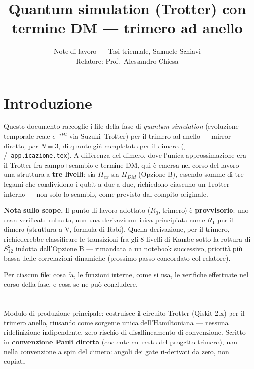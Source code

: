 \documentclass[11pt,a4paper]{article}
\title{Quantum simulation (Trotter) con termine DM — trimero ad anello}
\author{Note di lavoro — Tesi triennale, Samuele Schiavi\\ Relatore: Prof.\ Alessandro Chiesa}
\date{}
\begin{document}
\maketitle

\section*{Introduzione}

Questo documento raccoglie i file della fase di \emph{quantum simulation} (evoluzione
temporale reale $e^{-iHt}$ via Suzuki--Trotter) per il trimero ad anello — mirror
diretto, per $N=3$, di quanto già completato per il dimero
(\texttt{},
\texttt{}/\texttt{\_applicazione.tex}).
A differenza del dimero, dove l'unica approssimazione era il Trotter fra campo+scambio
e termine DM, qui è emersa nel corso del lavoro una struttura a \textbf{tre livelli}:
sia $H_{ex}$ sia $H_{DM}$ (Opzione B), essendo somme di tre legami che condividono i
qubit a due a due, richiedono ciascuno un Trotter interno — non solo lo scambio, come
previsto dal compito originale.

\textbf{Nota sullo scope.} Il punto di lavoro adottato ($R_0$, trimero) è
\textbf{provvisorio}: uno scan verificato robusto, non una derivazione fisica
principiata come $R_1$ per il dimero (struttura a V, formula di Rabi). Quella
derivazione, per il trimero, richiederebbe classificare le transizioni fra gli 8
livelli di Kambe sotto la rottura di $S_{12}^2$ indotta dall'Opzione B — rimandata a
un notebook successivo, priorità più bassa delle correlazioni dinamiche (prossimo
passo concordato col relatore).

Per ciascun file: cosa fa, le funzioni interne, come si usa, le verifiche effettuate
nel corso della fase, e cosa se ne può concludere.

\section*{\texttt{}}

Modulo di produzione principale: costruisce il circuito Trotter (Qiskit 2.x) per il
trimero anello, riusando \texttt{} come sorgente unica
dell'Hamiltoniana — nessuna ridefinizione indipendente, zero rischio di
disallineamento di convenzione. Scritto in \textbf{convenzione Pauli diretta}
(coerente col resto del progetto trimero), non nella convenzione a spin del dimero:
angoli dei gate ri-derivati da zero, non copiati.
\end{document}
